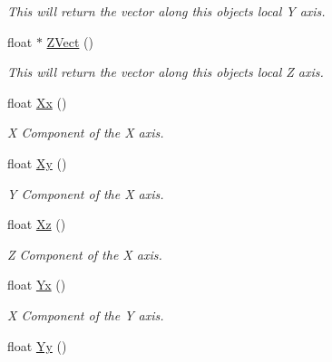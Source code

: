 \begin{DoxyCompactItemize}
\begin{DoxyCompactList}\small\item\em This will return the vector along this objects local Y axis. \end{DoxyCompactList}\item 
\hypertarget{classc_matrix4_ab3d5e1a9ca6652c84265d4d164494699}{
float $\ast$ \hyperlink{classc_matrix4_ab3d5e1a9ca6652c84265d4d164494699}{ZVect} ()}
\label{classc_matrix4_ab3d5e1a9ca6652c84265d4d164494699}

\begin{DoxyCompactList}\small\item\em This will return the vector along this objects local Z axis. \end{DoxyCompactList}\item 
\hypertarget{classc_matrix4_a46a1fd03c71ffc4554f2a0f611260d84}{
float \hyperlink{classc_matrix4_a46a1fd03c71ffc4554f2a0f611260d84}{Xx} ()}
\label{classc_matrix4_a46a1fd03c71ffc4554f2a0f611260d84}

\begin{DoxyCompactList}\small\item\em X Component of the X axis. \end{DoxyCompactList}\item 
\hypertarget{classc_matrix4_ab345450c98494d70efcc2cdc0bdd90f6}{
float \hyperlink{classc_matrix4_ab345450c98494d70efcc2cdc0bdd90f6}{Xy} ()}
\label{classc_matrix4_ab345450c98494d70efcc2cdc0bdd90f6}

\begin{DoxyCompactList}\small\item\em Y Component of the X axis. \end{DoxyCompactList}\item 
\hypertarget{classc_matrix4_a9acdcdf379f77a0ec47214620e1a5f9a}{
float \hyperlink{classc_matrix4_a9acdcdf379f77a0ec47214620e1a5f9a}{Xz} ()}
\label{classc_matrix4_a9acdcdf379f77a0ec47214620e1a5f9a}

\begin{DoxyCompactList}\small\item\em Z Component of the X axis. \end{DoxyCompactList}\item 
\hypertarget{classc_matrix4_af4dc361f269ecd60238ce0b647313504}{
float \hyperlink{classc_matrix4_af4dc361f269ecd60238ce0b647313504}{Yx} ()}
\label{classc_matrix4_af4dc361f269ecd60238ce0b647313504}

\begin{DoxyCompactList}\small\item\em X Component of the Y axis. \end{DoxyCompactList}\item 
\hypertarget{classc_matrix4_a4f8182f7b1ec729250c500b1ac9c0696}{
float \hyperlink{classc_matrix4_a4f8182f7b1ec729250c500b1ac9c0696}{Yy} ()}
\label{classc_matrix4_a4f8182f7b1ec729250c500b1ac9c0696}


\end{DoxyCompactItemize}
